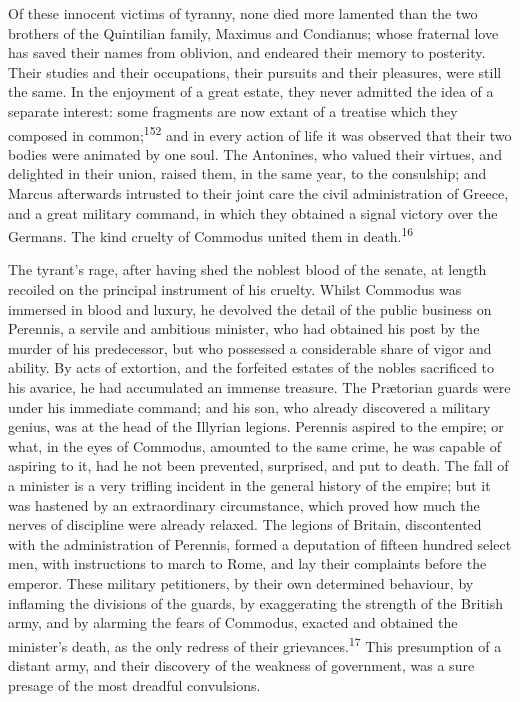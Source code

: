 
Of these innocent victims of tyranny, none died more lamented
than the two brothers of the Quintilian family, Maximus and
Condianus; whose fraternal love has saved their names from
oblivion, and endeared their memory to posterity. Their studies
and their occupations, their pursuits and their pleasures, were
still the same. In the enjoyment of a great estate, they never
admitted the idea of a separate interest: some fragments are now
extant of a treatise which they composed in common;\textsuperscript{152} and in
every action of life it was observed that their two bodies were
animated by one soul. The Antonines, who valued their virtues,
and delighted in their union, raised them, in the same year, to
the consulship; and Marcus afterwards intrusted to their joint
care the civil administration of Greece, and a great military
command, in which they obtained a signal victory over the
Germans. The kind cruelty of Commodus united them in death.\textsuperscript{16}



The tyrant’s rage, after having shed the noblest blood of the
senate, at length recoiled on the principal instrument of his
cruelty. Whilst Commodus was immersed in blood and luxury, he
devolved the detail of the public business on Perennis, a servile
and ambitious minister, who had obtained his post by the murder
of his predecessor, but who possessed a considerable share of
vigor and ability. By acts of extortion, and the forfeited
estates of the nobles sacrificed to his avarice, he had
accumulated an immense treasure. The Prætorian guards were under
his immediate command; and his son, who already discovered a
military genius, was at the head of the Illyrian legions.
Perennis aspired to the empire; or what, in the eyes of Commodus,
amounted to the same crime, he was capable of aspiring to it, had
he not been prevented, surprised, and put to death. The fall of a
minister is a very trifling incident in the general history of
the empire; but it was hastened by an extraordinary circumstance,
which proved how much the nerves of discipline were already
relaxed. The legions of Britain, discontented with the
administration of Perennis, formed a deputation of fifteen
hundred select men, with instructions to march to Rome, and lay
their complaints before the emperor. These military petitioners,
by their own determined behaviour, by inflaming the divisions of
the guards, by exaggerating the strength of the British army, and
by alarming the fears of Commodus, exacted and obtained the
minister’s death, as the only redress of their grievances.\textsuperscript{17}
This presumption of a distant army, and their discovery of the
weakness of government, was a sure presage of the most dreadful
convulsions.

